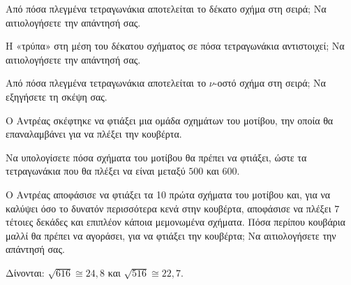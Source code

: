 \begin{alist}
\item

\begin{rlist}
\item Από πόσα πλεγμένα τετραγωνάκια αποτελείται το δέκατο σχήμα στη σειρά; Να αιτιολογήσετε την απάντησή σας.
\item Η «τρύπα» στη μέση του δέκατου σχήματος σε πόσα τετραγωνάκια αντιστοιχεί; Να αιτιολογήσετε την απάντησή σας.
\end{rlist}
\item Από πόσα πλεγμένα τετραγωνάκια αποτελείται το $\nu$-οστό σχήμα στη σειρά; Να εξηγήσετε τη σκέψη σας.
\item Ο Αντρέας σκέφτηκε να φτιάξει μια ομάδα σχημάτων του μοτίβου, την οποία θα επαναλαμβάνει για να πλέξει την κουβέρτα.

\begin{rlist}
\item Να υπολογίσετε πόσα σχήματα του μοτίβου θα πρέπει να φτιάξει, ώστε τα τετραγωνάκια που θα πλέξει να είναι μεταξύ $500$ και $600$.
\item Ο Αντρέας αποφάσισε να φτιάξει τα 10 πρώτα σχήματα του μοτίβου και, για να καλύψει όσο το δυνατόν περισσότερα κενά στην κουβέρτα, αποφάσισε να πλέξει $7$ τέτοιες δεκάδες και επιπλέον κάποια μεμονωμένα σχήματα. Πόσα περίπου κουβάρια μαλλί θα πρέπει να αγοράσει, για να φτιάξει την κουβέρτα; Να αιτιολογήσετε την απάντησή σας.

Δίνονται: $\sqrt{616} \cong 24{,}8$ και $\sqrt{516} \cong 22{,}7$.
\end{rlist}
\end{alist}

